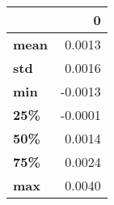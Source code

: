 \begin{tabular}{lr}
\toprule
{} &       0 \\
\midrule
\textbf{mean} &  0.0013 \\
\textbf{std } &  0.0016 \\
\textbf{min } & -0.0013 \\
\textbf{25\% } & -0.0001 \\
\textbf{50\% } &  0.0014 \\
\textbf{75\% } &  0.0024 \\
\textbf{max } &  0.0040 \\
\bottomrule
\end{tabular}
